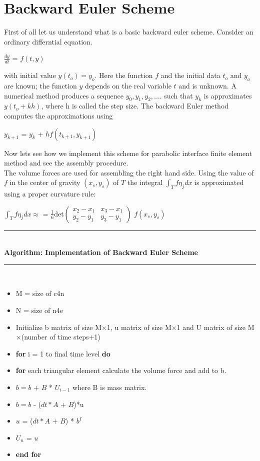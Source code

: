 \documentclass{report}
\numberwithin{equation}{chapter}
\begin{document}
\section{Backward Euler Scheme}
\begin{spacing}{1.5}
First of all let us understand what is a basic backward euler scheme. Consider an ordinary differntial equation.
\begin{center}
$\frac{dy}{dt}$ = $f(t,y)$
\end{center}
with initial value $y(t_{o}) = y_{o}$. Here the function $f$ and the initial data $t_{o}$ and $y_{o}$ are known; the function $y$ depends on the real variable $t$ and is unknown. A numerical method produces a sequence $y_{0},y_{1},y_{2},....$ such that $y_{k}$ is approximates $y(t_{o}+kh)$, where h is called the step size. The backward Euler method computes the approximations using
\begin{center}
$y_{k+1}$ = $y_{k}$ + $hf(t_{k+1},y_{k+1})$
\end{center}
Now lets see how we implement this scheme for parabolic interface finite element method and see the assembly procedure.\\
The volume forces are used for assembling the right hand side. Using the value of $f$ in the center of gravity $(x_{s},y_{s})$ of $T$ the integral $\int_{T}f\eta_{j}dx$ is approximated using a proper curvature rule:
\begin{center}
$\int_{T}f\eta_{j}dx \approx$ = $\frac{1}{6}$det$
\begin{pmatrix}
x_{2}-x_{1} & x_{3}-x_{1}\\
y_{2}-y_{1} & y_{3}-y_{1}
\end{pmatrix}
$
$f(x_{s},y_{s})$
\end{center}
\noindent\rule{12cm}{0.4pt}\\
\textbf{Algorithm: Implementation of Backward Euler Scheme}\\
\noindent\rule{12cm}{0.4pt}\\
\begin{itemize}
\item[1:] M = size of c4n
\item[2:] N = size of n4e
\item[3:] Initialize b matrix of size M$\times$1, u matrix of size M$\times$1 and U matrix of size M$\times$(number of time steps+1)
\item[4:] \textbf{for} i = 1 to final time level \textbf{do}
\item[5:] \textbf{for} each triangular element calculate the volume force and add to b.
\item[6:] $b = b$ + $B$ * $U_{i-1}$ where B is mass matrix.
\item[7:] $b = b$ - ($dt*A$ + $B$)*u
\item[8:] $u$ = ($dt*A$ + $B$) * $b^{I}$
\item[9:] $U_{n}$ = $u$
\item[10:] \textbf{end for}
\end{itemize}
\end{spacing}
\end{document}
